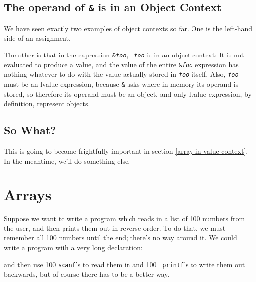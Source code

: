 \subsection{ The operand of {\tt\&} is in an Object Context}

We have seen exactly two examples of object contexts so far.  One is the
left-hand side of an assignment.

The other is that in the expression {\tt \&{\em foo}\/}, {\tt {\em
foo}\/} is in an object context: It is not evaluated to produce a value,
and the value of the entire {\tt \&{\em foo}\/} expression has nothing
whatever to do with the value actually stored in {\tt {\em foo}\/}
itself.  Also, {\tt {\em foo}\/} must be an lvalue expression, because
{\tt\&} asks where in memory its operand is stored, so therefore its
operand must be an object, and only lvalue expression, by definition,
represent objects.

\subsection{So What?}

This is going to become frightfully important in section
\ref{array-in-value-context}.  In the meantime, we'll do something else.

\section{Arrays}

Suppose we want to write a program which reads in a list of 100 numbers
from the user, and then prints them out in reverse order. To do that, we
must remember all 100 numbers until the end; there's no way around it.
We could write a program with a very long declaration:

\begin{flushleft}
\verb% int main(void) % \\*
\verb% { %  \\*
\verb%   int n0, n1, n2, n3, n4, n5, n6, n7, n8, n9; % \\*
\verb%   . . . % \\*
\verb%   int n90, n91, n92, n93, n94, n95, n96, n97, n98, n99; % \\*
\verb% % \\*
\verb%   . . . % \\*
\verb% } %
\end{flushleft}

\noindent and then use 100 {\tt scanf}'s to read them in and 100 {\tt
printf}'s to write them out backwards, but of course there has to be a
better way.  

